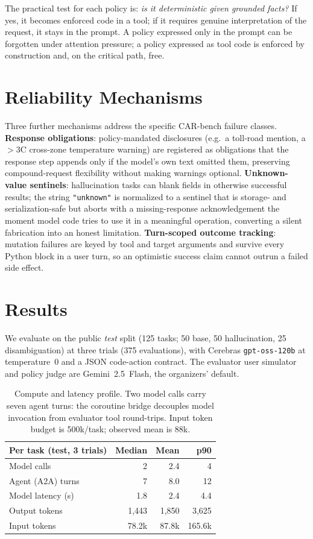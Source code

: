 \documentclass{article}
\begin{document}
The practical test for each policy is: \emph{is it deterministic given grounded
facts?} If yes, it becomes enforced code in a tool; if it requires genuine
interpretation of the request, it stays in the prompt. A policy expressed only
in the prompt can be forgotten under attention pressure; a policy expressed as
tool code is enforced by construction and, on the critical path, free.

\section{Reliability Mechanisms}

Three further mechanisms address the specific CAR-bench failure classes.
\textbf{Response obligations}: policy-mandated disclosures (e.g.\ a toll-road
mention, a $>$3\textdegree C cross-zone temperature warning) are registered as
obligations that the response step appends only if the model's own text omitted
them, preserving compound-request flexibility without making warnings optional.
\textbf{Unknown-value sentinels}: hallucination tasks can blank fields in
otherwise successful results; the string \texttt{"unknown"} is normalized to a
sentinel that is storage- and serialization-safe but aborts with a
missing-response acknowledgement the moment model code tries to use it in a
meaningful operation, converting a silent fabrication into an honest limitation.
\textbf{Turn-scoped outcome tracking}: mutation failures are keyed by tool and
target arguments and survive every Python block in a user turn, so an optimistic
success claim cannot outrun a failed side effect.

\section{Results}

We evaluate on the public \emph{test} split (125 tasks; 50 base, 50
hallucination, 25 disambiguation) at three trials (375 evaluations), with
Cerebras \texttt{gpt-oss-120b} at temperature~0 and a JSON code-action contract.
The evaluator user simulator and policy judge are Gemini~2.5~Flash, the
organizers' default.

\begin{table}[t]
\centering
\begin{tabular}{lrrr}
\toprule
Per task (test, 3 trials) & Median & Mean & p90 \\
\midrule
Model calls          & 2      & 2.4   & 4     \\
Agent (A2A) turns    & 7      & 8.0   & 12    \\
Model latency (s)    & 1.8    & 2.4   & 4.4   \\
Output tokens        & 1{,}443 & 1{,}850 & 3{,}625 \\
Input tokens         & 78.2k  & 87.8k & 165.6k \\
\bottomrule
\end{tabular}
\caption{Compute and latency profile. Two model calls carry seven agent turns:
the coroutine bridge decouples model invocation from evaluator tool
round-trips. Input token budget is 500k/task; observed mean is 88k.}
\label{tab:compute}
\end{table}
\end{document}

